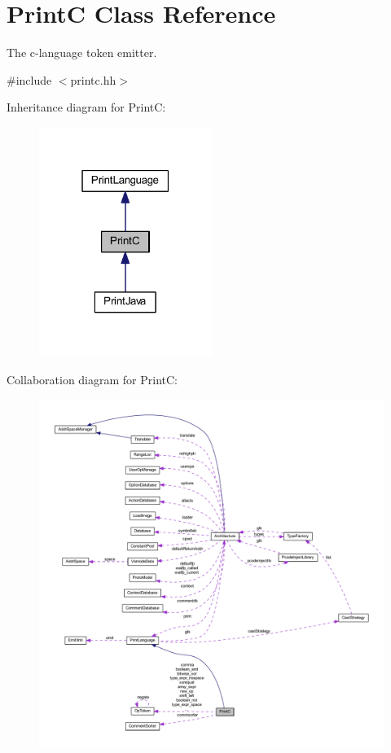 \hypertarget{class_print_c}{}\section{PrintC Class Reference}
\label{class_print_c}


The c-\/language token emitter.  




{\ttfamily \#include $<$printc.\+hh$>$}



Inheritance diagram for PrintC\+:
\nopagebreak
\begin{figure}[H]
\begin{center}
\leavevmode
\includegraphics[width=159pt]{class_print_c__inherit__graph}
\end{center}
\end{figure}


Collaboration diagram for PrintC\+:
\nopagebreak
\begin{figure}[H]
\begin{center}
\leavevmode
\includegraphics[width=350pt]{class_print_c__coll__graph}
\end{center}
\end{figure}
